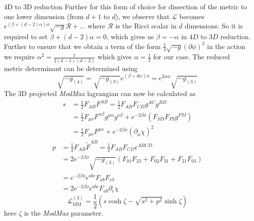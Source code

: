 \begin{frame}[allowframebreaks]{4D to 3D reduction \cite{Dharewa2024}}
Further for this form of choice for dissection of the metric to one lower dimension (from $d+1$ to $d$), we observe that $\mathcal{L}$ becomes $e^{(\beta+(d-2)\alpha)\phi}\sqrt{-g}\mathcal{R}+\hdots \text{ where } \mathcal{R}$ is the Ricci scalar in $d$ dimensions. So it is required to set $\beta+(d-2)\alpha=0$, which gives us $\beta=-\alpha$ in $4D$ to $3D$ reduction. Further to ensure that we obtain a term of the form $\frac{1}{2}\sqrt{-g}\left(\partial\phi\right)^2 $  in the action we require $\alpha^2 = \displaystyle\frac{1}{2(d-1)(d-2)}$ which gives $\alpha = \frac{1}{2}$ for our case. The reduced metric determinant can be determined using 
\begin{equation*}
    \sqrt{-g_{(4)}} = \sqrt{-g_{(3)}}e^{(\beta+d\alpha)\phi} = e^{2\alpha\phi}\sqrt{-g_{(3)}}
\end{equation*}
The 3D projected \textit{ModMax} lagrangian can now be calculated as
\begin{align*}
    s&=\frac{1}{2}F_{AB}F^{AB} = \frac{1}{2}F_{AB}F_{CD}g^{AC}g^{BD}\\ 
     &= \frac{1}{2}F_{\mu\nu}F^{\alpha\beta}g^{\mu\alpha}g^{\nu\beta} + e^{-2\beta\phi}\left(F_{M3}F_{P3}g^{PM}\right) \\ 
    &=\frac{1}{2}F_{\mu\nu}F^{\mu\nu} + e^{-2\beta\phi}(\partial_{\mu}\chi)^2
\end{align*}
\begin{align*}
    p&=\frac{1}{2}F_{AB}\tilde{F}^{AB} = \frac{1}{2}F_{AB}F_{CD}\epsilon^{ABCD} \\ 
    &= 2e^{-2\beta\phi}\sqrt{-g_{(3)}} \left ( F_{01}F_{23} + F_{02}F_{31} + F_{21}F_{03} \right ) \\ 
    &= e^{-2\beta\phi}\epsilon^{abc}F_{ab}F_{c3} \\ 
    &= 2e^{-2\beta\phi}\epsilon^{abc}F_{ab}\partial_{c}\chi
\end{align*}
\begin{equation}
    \mathcal{L}_{\text{MM}}^{(3)} = \frac{1}{2}\left(s\cosh\zeta - \sqrt{s^2 + p^2}\sinh\zeta\right)
\end{equation}
here $\zeta$ is the \textit{ModMax} parameter.


\end{frame}
